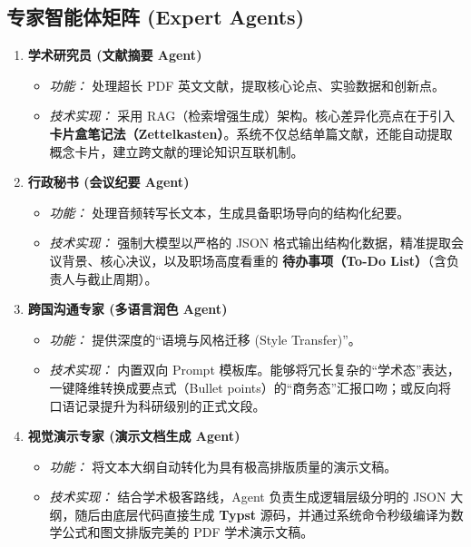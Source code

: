 \documentclass[12pt, a4paper]{ctexart}
\begin{document}
\subsection{专家智能体矩阵 (Expert Agents)}
\begin{enumerate}
    \item \textbf{学术研究员 (文献摘要 Agent)}
    \begin{itemize}
        \item \textit{功能：} 处理超长 PDF 英文文献，提取核心论点、实验数据和创新点。
        \item \textit{技术实现：} 采用 RAG（检索增强生成）架构。核心差异化亮点在于引入 \textbf{卡片盒笔记法（Zettelkasten）}。系统不仅总结单篇文献，还能自动提取概念卡片，建立跨文献的理论知识互联机制。
    \end{itemize}
    
    \item \textbf{行政秘书 (会议纪要 Agent)}
    \begin{itemize}
        \item \textit{功能：} 处理音频转写长文本，生成具备职场导向的结构化纪要。
        \item \textit{技术实现：} 强制大模型以严格的 JSON 格式输出结构化数据，精准提取会议背景、核心决议，以及职场高度看重的 \textbf{待办事项（To-Do List）}（含负责人与截止周期）。
    \end{itemize}

    \item \textbf{跨国沟通专家 (多语言润色 Agent)}
    \begin{itemize}
        \item \textit{功能：} 提供深度的“语境与风格迁移 (Style Transfer)”。
        \item \textit{技术实现：} 内置双向 Prompt 模板库。能够将冗长复杂的“学术态”表达，一键降维转换成要点式（Bullet points）的“商务态”汇报口吻；或反向将口语记录提升为科研级别的正式文段。
    \end{itemize}

    \item \textbf{视觉演示专家 (演示文档生成 Agent)}
    \begin{itemize}
        \item \textit{功能：} 将文本大纲自动转化为具有极高排版质量的演示文稿。
        \item \textit{技术实现：} 结合学术极客路线，Agent 负责生成逻辑层级分明的 JSON 大纲，随后由底层代码直接生成 \textbf{Typst} 源码，并通过系统命令秒级编译为数学公式和图文排版完美的 PDF 学术演示文稿。
    \end{itemize}
\end{enumerate}
\end{document}

